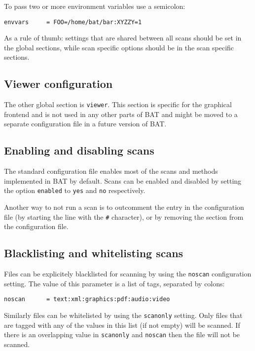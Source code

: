 \documentclass[10pt,a4paper]{article}
\begin{document}
To pass two or more environment variables use a semicolon:

\begin{verbatim}
envvars     = FOO=/home/bat/bar:XYZZY=1
\end{verbatim}

As a rule of thumb: settings that are shared between all scans should be set in
the global sections, while scan specific options should be in the scan
specific sections.

\subsection{Viewer configuration}

The other global section is \texttt{viewer}. This section is specific for the
graphical frontend and is not used in any other parts of BAT and might be moved
to a separate configuration file in a future version of BAT.

\subsection{Enabling and disabling scans}

The standard configuration file enables most of the scans and methods
implemented in BAT by default. Scans can be enabled and disabled by setting the
option \texttt{enabled} to \texttt{yes} and \texttt{no} respectively.

Another way to not run a scan is to outcomment the entry in the configuration
file (by starting the line with the \texttt{\#} character), or by removing the
section from the configuration file.

\subsection{Blacklisting and whitelisting scans}

Files can be explicitely blacklisted for scanning by using the \texttt{noscan}
configuration setting. The value of this parameter is a list of tags, separated
by colons:

\begin{verbatim}
noscan      = text:xml:graphics:pdf:audio:video
\end{verbatim}

Similarly files can be whitelisted by using the \texttt{scanonly} setting. Only
files that are tagged with any of the values in this list (if not empty) will
be scanned. If there is an overlapping value in \texttt{scanonly} and
\texttt{noscan} then the file will not be scanned.
\end{document}
